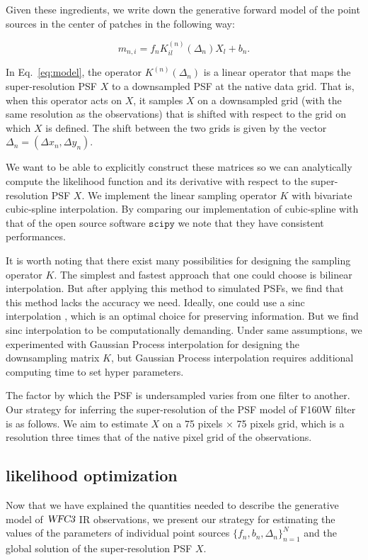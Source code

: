 \documentclass[onecolumn]{aastex61}
\newcommand{\beq}{\begin{equation}}
\newcommand{\eeq}{\end{equation}}
\newcommand{\project}[1]{{\textsl{#1}}}
\newcommand{\wfc}{\project{WFC3}}
\begin{document}
Given these ingredients, we write down the generative forward model of the point sources in the center of patches in the following way:

\beq 
 m_{n,i} = f_{n}K^{(n)}_{il} (\Delta_n) X_{l} + b_{n}. 
\label{eq:model}
\eeq

In Eq.~\ref{eq:model}, the operator $K^{(n)}(\Delta_n)$ is a linear operator that maps the super-resolution PSF $X$ to a downsampled PSF at the native 
data grid. That is, when this operator acts on $X$, it samples $X$ on a downsampled grid (with the same resolution as the observations) 
that is shifted with respect to the grid on which $X$ is defined. The shift between the two grids is given by the vector $\Delta_n = (\Delta x_n , \Delta y_n)$.


We want to be able to explicitly construct these matrices so we can analytically compute the likelihood function and its derivative with respect to the super-resolution PSF $X$. 
We implement the linear sampling operator $K$ with bivariate cubic-spline interpolation. By comparing our implementation of cubic-spline with that of the open source 
software $\mathtt{scipy}$ we note that they have consistent performances.

It is worth noting that there exist many possibilities for designing the sampling operator $K$.  The simplest and fastest approach that one could 
choose is bilinear interpolation. But after applying this method to simulated PSFs, we find that this method lacks the accuracy we 
need. Ideally, one could use a sinc interpolation \citep{bickerton,galsim}, which is an optimal choice for preserving information.
But we find sinc interpolation to be computationally demanding. Under same assumptions, we experimented with Gaussian Process interpolation for designing the downsampling matrix $K$, but Gaussian Process interpolation requires additional computing time to set hyper parameters.

The factor by which the PSF is undersampled varies from one filter to another. Our strategy for inferring the super-resolution of the PSF model of F160W filter is as follows. 
We aim to estimate $X$ on a 75 pixels $\times$ 75 pixels grid, which is a resolution three times that of the native pixel grid of the observations.

\subsection{likelihood optimization}

Now that we have explained the quantities needed to describe the generative model of $\wfc$ IR observations, we 
present our strategy for estimating the values of the parameters of individual point sources $\{f_{n},b_{n},\Delta_{n}\}_{n=1}^{N}$ and 
the global solution of the super-resolution PSF $X$.
\end{document}
